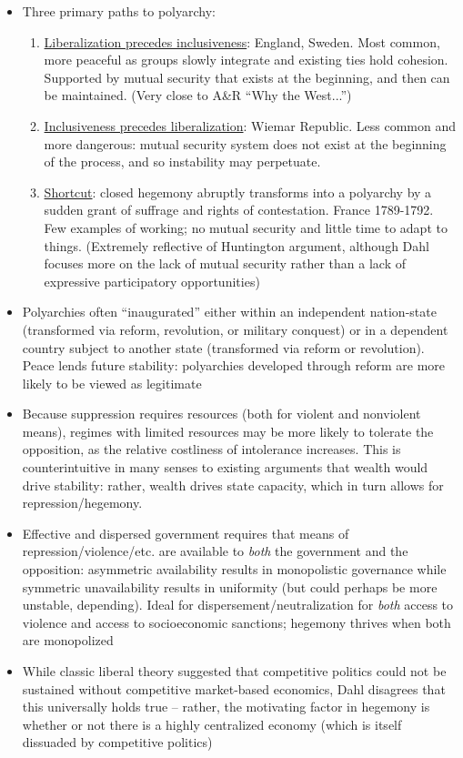 \documentclass[12pt]{article}
\begin{document}
\begin{itemize}[leftmargin=*, itemsep=4pt]
    \item Three primary paths to polyarchy:
    \begin{enumerate}
        \item \underline{Liberalization precedes inclusiveness}: England, Sweden. Most common, more peaceful as groups slowly integrate and existing ties hold cohesion. Supported by mutual security that exists at the beginning, and then can be maintained. (Very close to A\&R ``Why the West...'')
        \item \underline{Inclusiveness precedes liberalization}: Wiemar Republic. Less common and more dangerous: mutual security system does not exist at the beginning of the process, and so instability may perpetuate.
        \item \underline{Shortcut}: closed hegemony abruptly transforms into a polyarchy by a sudden grant of suffrage and rights of contestation. France 1789-1792. Few examples of working; no mutual security and little time to adapt to things. (Extremely reflective of Huntington argument, although Dahl focuses more on the lack of mutual security rather than a lack of expressive participatory opportunities)
    \end{enumerate}
    \item Polyarchies often ``inaugurated'' either within an independent nation-state (transformed via reform, revolution, or military conquest) or in a dependent country subject to another state (transformed via reform or revolution). Peace lends future stability: polyarchies developed through reform are more likely to be viewed as legitimate
    \item Because suppression requires resources (both for violent and nonviolent means), regimes with limited resources may be more likely to tolerate the opposition, as the relative costliness of intolerance increases. This is counterintuitive in many senses to existing arguments that wealth would drive stability: rather, wealth drives state capacity, which in turn allows for repression/hegemony.
    \item Effective and dispersed government requires that means of repression/violence/etc. are available to \textit{both} the government and the opposition: asymmetric availability results in monopolistic governance while symmetric unavailability results in uniformity (but could perhaps be more unstable, depending). Ideal for dispersement/neutralization for \textit{both} access to violence and access to socioeconomic sanctions; hegemony thrives when both are monopolized
    \item While classic liberal theory suggested that competitive politics could not be sustained without competitive market-based economics, Dahl disagrees that this universally holds true -- rather, the motivating factor in hegemony is whether or not there is a highly centralized economy (which is itself dissuaded by competitive politics)

\end{itemize}
\end{document}
